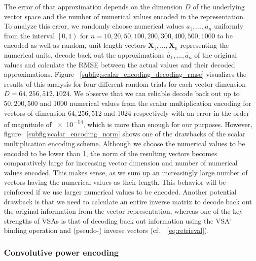 The error of that approximation depends on the dimension $D$ of the underlying vector space and the number of numerical values encoded in the representation.
To analyze this error, we randomly choose numerical values $a_{1}, \ldots, a_{n}$ uniformly from the interval $ \left[0, 1\right)$ for $n=10, 20, 50,100,200,300,400,500,1000$ to be encoded as well as random, unit-length vectors $\mathbf{X}_{1}, \ldots, \mathbf{X}_{n}$ representing the numerical units, decode back out the approximations $\hat{a}_{1}, \ldots, \hat{a}_{n}$ of the original values and calculate the \ac{RMSE} between the actual values and their decoded approximations.
Figure ~\ref{subfig:scalar_encoding_decoding_rmse} visualizes the results of this analysis for four different random trials for each vector dimension  $D=64, 256, 512, 1024$.
We observe that we can reliable decode back out up to $50, 200, 500$ and \num{1000} numerical values from the scalar multiplication encoding for vectors of dimension $64, 256, 512$ and \num{1024} respectively with an error in the order of magnitude of \num{e-14}, which is more than enough for our purposes.
However, figure ~\ref{subfig:scalar_encoding_norm} shows one of the drawbacks of the scalar multiplication encoding scheme.
Although we choose the numerical values to be encoded to be lower than \num{1}, the norm of the resulting vectors becomes comparatively large for increasing vector dimension and number of numerical values encoded.
This makes sense, as we sum up an increasingly large number of vectors having the numerical values as their length.
This behavior will be reinforced if we use larger numerical values to be encoded.
Another potential drawback is that we need to calculate an entire inverse matrix to decode back out the original information from the vector representation, whereas one of the key strengths of \acp{VSA} is that of decoding back out information using the \ac{VSA}' binding operation and (pseudo-) inverse vectors (cf.\ ~\ref{eq:retrieval}).

\subsubsection{Convolutive power encoding}%
\label{ssubsec:convolutive_power_encoding}

